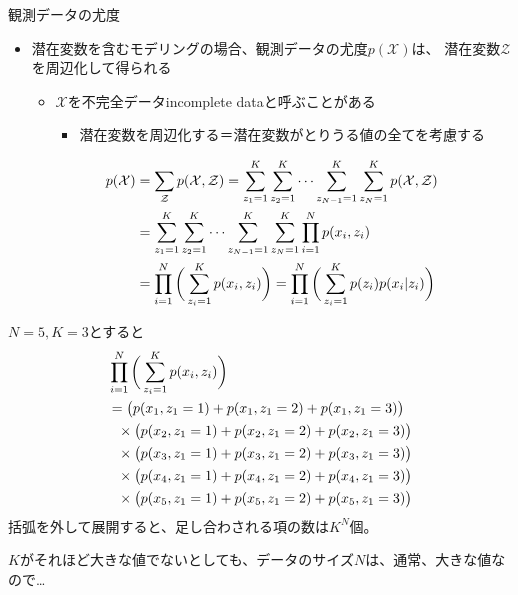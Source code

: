 \documentclass[aspectratio=169,unicode,dvipdfmx,14pt]{beamer}
\begin{document}
\begin{frame}{観測データの尤度}
\vspace{-.05in}
\begin{itemize}
\item 潜在変数を含むモデリングの場合、観測データの尤度$p(\mathcal{X})$は、
潜在変数$\mathcal{Z}$を周辺化して得られる
\begin{itemize}
\item $\mathcal{X}$を不完全データincomplete dataと呼ぶことがある
\begin{itemize}
\item 潜在変数を周辺化する＝潜在変数がとりうる値の全てを考慮する
\end{itemize}
\end{itemize}
\vspace{-.1in}
\begin{align}
p(\mathcal{X}) & = \sum_{\mathcal{Z}} p(\mathcal{X}, \mathcal{Z})
= \sum_{z_1=1}^K \sum_{z_2=1}^K \cdots \sum_{z_{N-1}=1}^K \sum_{z_N=1}^K p(\mathcal{X}, \mathcal{Z})
\notag \\ &
= \sum_{z_1=1}^K \sum_{z_2=1}^K \cdots \sum_{z_{N-1}=1}^K \sum_{z_N=1}^K \prod_{i=1}^N p(x_i, z_i)
\notag \\ &
= \prod_{i=1}^N \bigg( \sum_{z_i=1}^K p(x_i , z_i) \bigg)
= \prod_{i=1}^N \bigg( \sum_{z_i=1}^K p(z_i) p(x_i | z_i) \bigg)
\label{eq:LH_mixture}
\end{align}
\end{itemize}
\end{frame}

\begin{frame}
\FontMath
$N=5, K=3$とすると
\begin{align}
& \prod_{i=1}^N \bigg( \sum_{z_i=1}^K p(x_i , z_i) \bigg)
\notag \\ &
= \big( p(x_1, z_1=1) + p(x_1,z_1=2) + p(x_1,z_1=3) \big)
\notag \\ & \mbox{ \  }
\times \big( p(x_2, z_1=1) + p(x_2,z_1=2) + p(x_2,z_1=3) \big)
\notag \\ & \mbox{ \  }
\times \big( p(x_3, z_1=1) + p(x_3,z_1=2) + p(x_3,z_1=3) \big)
\notag \\ & \mbox{ \  }
\times \big( p(x_4, z_1=1) + p(x_4,z_1=2) + p(x_4,z_1=3) \big)
\notag \\ & \mbox{ \  }
\times \big( p(x_5, z_1=1) + p(x_5,z_1=2) + p(x_5,z_1=3) \big)
\end{align}
括弧を外して展開すると、足し合わされる項の数は$K^N$個。

$K$がそれほど大きな値でないとしても、データのサイズ$N$は、通常、大きな値なので…
\end{frame}
\end{document}
